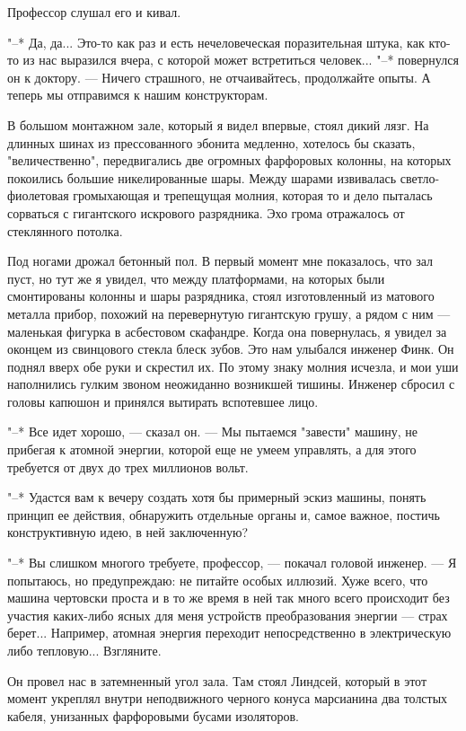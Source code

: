 Профессор слушал его и кивал.

"--* Да, да... Это-то как раз и есть нечеловеческая  поразительная  штука,
как кто-то из нас выразился вчера, с которой может встретиться  человек...
"--*  повернулся  он  к  доктору.  ---  Ничего  страшного,   не   отчаивайтесь,
продолжайте опыты. А теперь мы отправимся к нашим конструкторам.

В большом монтажном зале, который я видел впервые, стоял дикий лязг. На
длинных шинах из прессованного  эбонита  медленно,  хотелось  бы  сказать,
"величественно", передвигались две огромных фарфоровых колонны, на которых
покоились   большие   никелированные   шары.   Между   шарами   извивалась
светло-фиолетовая громыхающая и  трепещущая  молния,  которая  то  и  дело
пыталась  сорваться  с  гигантского  искрового   разрядника.   Эхо   грома
отражалось от стеклянного потолка.

Под ногами дрожал бетонный пол. В первый момент мне показалось, что зал
пуст, но  тут  же  я  увидел,  что  между  платформами,  на  которых  были
смонтированы колонны и шары разрядника, стоял  изготовленный  из  матового
металла прибор, похожий на перевернутую гигантскую грушу, а рядом с ним  ---
маленькая фигурка в асбестовом скафандре. Когда она повернулась, я  увидел
за оконцем из свинцового стекла блеск  зубов.  Это  нам  улыбался  инженер
Финк. Он поднял вверх обе руки  и  скрестил  их.  По  этому  знаку  молния
исчезла, и мои уши наполнились гулким звоном неожиданно возникшей  тишины.
Инженер сбросил с головы капюшон и принялся вытирать вспотевшее лицо.

"--* Все идет хорошо, --- сказал он. ---  Мы  пытаемся  "завести"  машину,  не
прибегая к атомной энергии, которой еще не умеем управлять,  а  для  этого
требуется от двух до трех миллионов вольт.

"--* Удастся вам к вечеру создать хотя бы примерный эскиз  машины,  понять
принцип ее действия, обнаружить отдельные органы и, самое важное,  постичь
конструктивную идею, в ней заключенную?

"--* Вы слишком многого требуете, профессор, --- покачал головой инженер.  ---
Я попытаюсь, но предупреждаю: не питайте особых иллюзий. Хуже  всего,  что
машина чертовски проста и в то же время в ней так много  всего  происходит
без участия каких-либо ясных для меня устройств преобразования  энергии  ---
страх берет...  Например,  атомная  энергия  переходит  непосредственно  в
электрическую либо тепловую... Взгляните.

Он провел нас в затемненный угол зала. Там  стоял  Линдсей,  который  в
этот момент укреплял внутри неподвижного  черного  конуса  марсианина  два
толстых кабеля, унизанных фарфоровыми бусами изоляторов.

